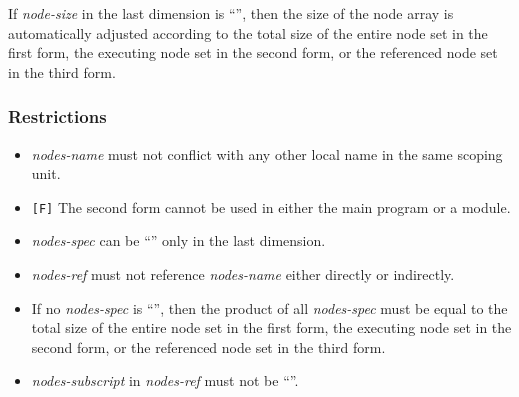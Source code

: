 %

If {\it node-size} in the last dimension is ``{\tt *}'', then the size
of the node array is automatically adjusted according to the total size
of the entire node set in the first form, the executing node set in the
second form, or the referenced node set in the third form.

\subsubsection*{Restrictions}

\begin{itemize}
\item {\it nodes-name} must not conflict with any other local name in
      the same scoping unit.
\item \verb![F]! The second form cannot be used in either the main
      program or a module.
\item {\it nodes-spec} can be ``{\tt *}'' only in the last dimension.
\item {\it nodes-ref} must not reference {\it nodes-name} either
      directly or indirectly.
\item If no {\it nodes-spec} is ``{\tt *}'', then the product
      of all {\it nodes-spec} must be equal to the total size of the
      entire node set in the first form, the executing node set in the
      second form, or the referenced node set in the third form.
%
\item {\it nodes-subscript} in {\it nodes-ref} must not be ``{\tt *}''.
\end{itemize}

